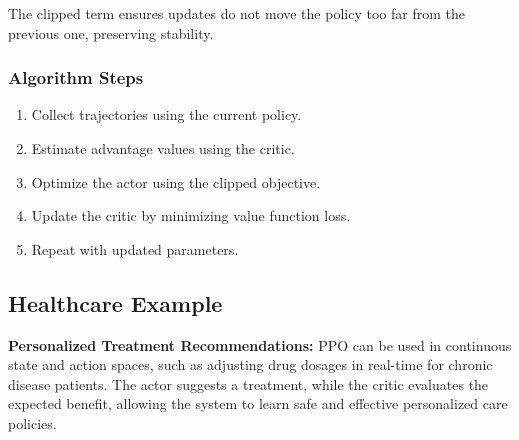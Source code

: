 \documentclass[12pt]{article}
\begin{document}
The clipped term ensures updates do not move the policy too far from the previous one, preserving stability.

\subsubsection*{Algorithm Steps}
\begin{enumerate}
    \item Collect trajectories using the current policy.
    \item Estimate advantage values using the critic.
    \item Optimize the actor using the clipped objective.
    \item Update the critic by minimizing value function loss.
    \item Repeat with updated parameters.
\end{enumerate}

\subsection*{Healthcare Example}

\textbf{Personalized Treatment Recommendations:} PPO can be used in continuous state and action spaces, such as adjusting drug dosages in real-time for chronic disease patients. The actor suggests a treatment, while the critic evaluates the expected benefit, allowing the system to learn safe and effective personalized care policies.
\end{document}
